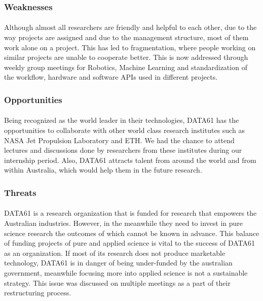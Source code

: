 \subsubsection*{Weaknesses}
\paragraph{}
Although almost all researchers are friendly and helpful to each other, due to the way projects are assigned and due to the management structure, most of them work alone on a project. This has led to fragmentation, where people working on similar projects are unable to cooperate better. This is now addressed through weekly group meetings for Robotics, Machine Learning and standardization of the workflow, hardware and software APIs used in different projects.


\subsubsection*{Opportunities}
\paragraph{}
Being recognized as the world leader in their technologies, DATA61 has the opportunities to collaborate with other world class research institutes such as NASA Jet Propulsion Laboratory and ETH. We had the chance to attend lectures and discussions done by researchers from these institutes during our internship period. Also, DATA61 attracts talent from around the world and from within Australia, which would help them in the future research.

\subsubsection*{Threats}
\paragraph{}
DATA61 is a research organization that is funded for research that empowers the Australian industries. However, in the meanwhile they need to invest in pure science research the outcomes of which cannot be known in advance. This balance of funding projects of pure and applied science is vital to the success of DATA61 as an organization. If most of its research does not produce marketable technology, DATA61 is in danger of being under-funded by the australian government, meanwhile focusing more into applied science is not a sustainable strategy. This issue was discussed on multiple meetings as a part of their restructuring process.


